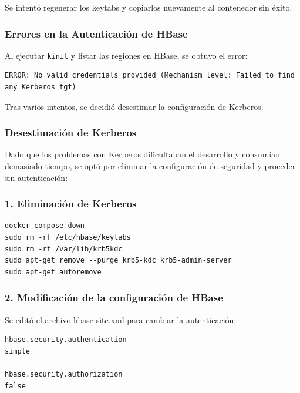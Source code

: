 \documentclass{article}
\begin{document}
Se intentó regenerar los keytabs y copiarlos nuevamente al contenedor sin éxito.

\vspace{5mm}


\subsubsection{Errores en la Autenticación de HBase}

Al ejecutar \texttt{kinit} y listar las regiones en HBase, se obtuvo el error:

\begin{verbatim}
ERROR: No valid credentials provided (Mechanism level: Failed to find any Kerberos tgt)
\end{verbatim}

Tras varios intentos, se decidió desestimar la configuración de Kerberos.

\subsubsection{Desestimación de Kerberos}
Dado que los problemas con Kerberos dificultaban el desarrollo y consumían demasiado tiempo, se optó por eliminar la configuración de seguridad y proceder sin autenticación:

\vspace{5mm}

\subsubsection{1. Eliminación de Kerberos}

\begin{lstlisting}[style=bashStyle]
docker-compose down
sudo rm -rf /etc/hbase/keytabs
sudo rm -rf /var/lib/krb5kdc
sudo apt-get remove --purge krb5-kdc krb5-admin-server
sudo apt-get autoremove
\end{lstlisting}

\newpage
\subsubsection{2. Modificación de la configuración de HBase}

Se editó el archivo hbase-site.xml para cambiar la autenticación:


\begin{verbatim}
hbase.security.authentication
simple

hbase.security.authorization
false
\end{verbatim}
\end{document}
